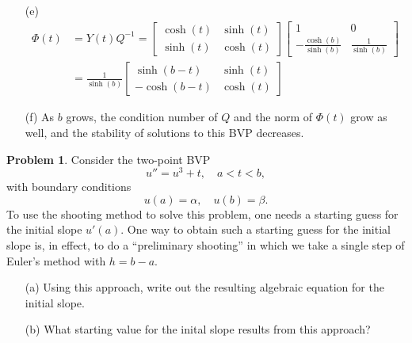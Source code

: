 \documentclass[a4paper]{book}
\makeatletter
\newenvironment{sol}[1][\solname]{\par
  \pushQED{\qed}
  \normalfont \topsep6\p@\@plus6\p@\relax
  \trivlist
  \item[\hskip\labelsep
        \itshape
    #1\@addpunct{.}]\ignorespaces
}{\popQED\endtrivlist\@endpefalse}
\providecommand{\solname}{Solution}
\numberwithin{equation}{chapter}
\theoremstyle{definition}
\newtheorem{pro}{Problem}
\makeatother
\begin{document}
\begin{sol}
\begin{itemize}
    \item[(e)]
      \begin{align*}
        \Phi(t) &= Y(t)Q^{-1} =
        \begin{bmatrix}
          \cosh(t) & \sinh(t) \\
          \sinh(t) & \cosh(t)
        \end{bmatrix}
                     \begin{bmatrix}
                       1 & 0 \\
                       -\frac{\cosh(b)}{\sinh(b)} & \frac{1}{\sinh(b)}
                     \end{bmatrix} \\
        &= \frac{1}{\sinh(b)}
          \begin{bmatrix}
            \sinh(b-t) & \sinh(t) \\
            -\cosh(b-t) & \cosh(t)
          \end{bmatrix}
      \end{align*}
  
    \item[(f)]
      As $b$ grows,
      the condition number of $Q$ and the norm of $\Phi(t)$ grow as well,
      and the stability of solutions to this BVP decreases.
    \end{itemize}
  \end{sol}

  \begin{pro}
    Consider the two-point BVP
    \begin{displaymath}
      u'' = u^3 + t, \quad a < t < b,
    \end{displaymath}
    with boundary conditions
    \begin{displaymath}
      u(a) = \alpha, \quad u(b) = \beta.
    \end{displaymath}
    To use the shooting method to solve this problem,
    one needs a starting guess for the initial slope $u'(a)$.
    One way to obtain such a starting guess for the initial slope is,
    in effect,
    to do a ``preliminary shooting'' in which we take a single step
    of Euler's method with $h=b-a$.
    \begin{itemize}
    \item[(a)]
      Using this approach,
      write out the resulting algebraic equation for the initial slope.
  
    \item[(b)]
      What starting value for the inital slope results from this approach?
    \end{itemize}
  \end{pro}
  
\end{document}
